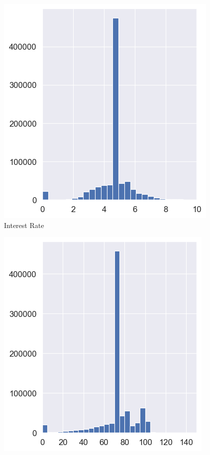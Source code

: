 \begin{figure}[h]
    \centering
    \begin{minipage}{0.5\textwidth}
        \centering
        \includegraphics[width=\textwidth]{images/CHXX_Numerical_Distributions_2_IR.png}
        \small
        Interest Rate
    \end{minipage}\hfill
    \begin{minipage}{0.5\textwidth}
        \centering
        \includegraphics[width=\textwidth]{images/CHXX_Numerical_Distributions_2_LTVR.png}

\end{minipage}
\end{figure}

